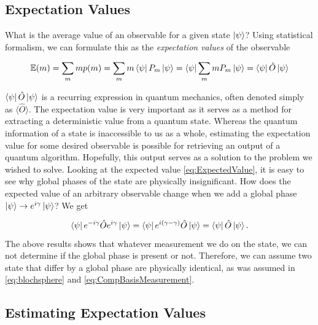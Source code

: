 \subsection{Expectation Values}\label{sec:ExpectationValues}

What is the average value of an observable for a given state $\ket{\psi}$? Using statistical formalism, we can formulate this as the \emph{expectation values} of the observable

\begin{equation}\label{eq:ExpectedValue}
    \mathbb{E}(m) = \sum_m m p(m) = \sum_m m \bra{\psi}P_m\ket{\psi} = \bra{\psi}\sum_m m P_m\ket{\psi} = \bra{\psi}\hat{O}\ket{\psi}
\end{equation}

$\bra{\psi}\hat{O}\ket{\psi}$ is a recurring expression in quantum mechanics, often denoted simply as $\langle \hat{O} \rangle$. The expectation value is very important as it serves as a method for extracting a deterministic value from a quantum state. Whereas the quantum information of a state is inaccessible to us as a whole, estimating the expectation value for some desired observable is possible for retrieving an output of a quantum algorithm. Hopefully, this output serves as a solution to the problem we wished to solve. Looking at the expected value \autoref{eq:ExpectedValue}, it is easy to see why global phases of the state are physically insignificant. How does the expected value of an arbitrary observable change when we add a global phase $\ket{\psi} \rightarrow e^{i\gamma}\ket{\psi}$? We get

\begin{equation}\label{eq:ExpectedValue}
    \bra{\psi}e^{-i\gamma}
    \hat{O}e^{i\gamma}\ket{\psi} =\bra{\psi}e^{i(\gamma-\gamma) }\hat{O}\ket{\psi} = 
    \bra{\psi}\hat{O}\ket{\psi}.
\end{equation}
The above results shows that whatever measurement we do on the state, we can not determine if the global phase is present or not. Therefore, we can assume two state that differ by a global phase are physically identical, as was assumed in \autoref{eq:blochsphere} and \autoref{eq:CompBasisMeasurement}.

\subsection{Estimating Expectation Values}\label{sec:EstimatingExpectationValues}

